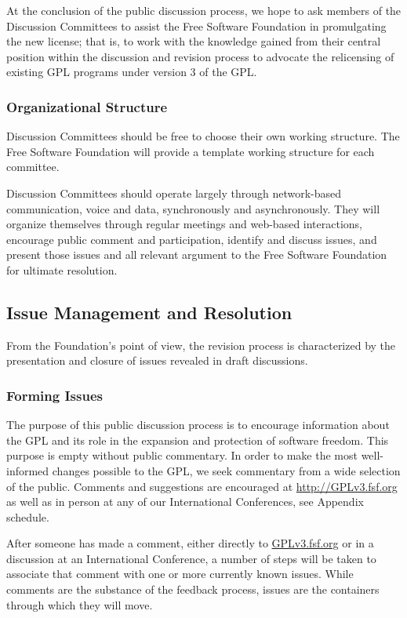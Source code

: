 \documentclass[a4paper,spanish,12pt]{book}
\begin{document}
At the conclusion of the public discussion process, we hope to ask
members of the Discussion Committees to assist the Free Software
Foundation in promulgating the new license; that is, to work with the
knowledge gained from their central position within the discussion and
revision process to advocate the relicensing of existing GPL programs
under version 3 of the GPL\@.

\subsubsection{Organizational Structure} Discussion Committees should be
free to choose their own working structure.  The Free Software
Foundation will provide a template working structure for each
committee.

Discussion Committees should operate largely through network-based
communication, voice and data, synchronously and asynchronously.  They
will organize themselves through regular meetings and web-based
interactions, encourage public comment and participation, identify and
discuss issues, and present those issues and all relevant argument to
the Free Software Foundation for ultimate resolution.


\subsection{Issue Management and Resolution} From the Foundation's point
of view, the revision process is characterized by the presentation and
closure of issues revealed in draft discussions.

\subsubsection{Forming Issues}\label{Feedback} The purpose of this public
discussion process is to encourage information about the GPL and its
role in the expansion and protection of software freedom.  This
purpose is empty without public commentary.  In order to make the most
well-informed changes possible to the GPL, we seek commentary from a
wide selection of the public.  Comments and suggestions are encouraged
at \url{http://GPLv3.fsf.org} as well as in person at any of our
International Conferences, see Appendix schedule.

After someone has made a comment, either directly to
\url{GPLv3.fsf.org} or in a discussion at an International
Conference, a number of steps will be taken to associate that comment
with one or more currently known issues.  While comments are the
substance of the feedback process, issues are the containers through
which they will move.
\end{document}
